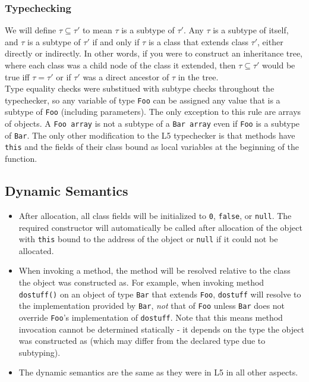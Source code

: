 \documentclass{article}
\begin{document}
\subsubsection{Typechecking}
We will define $\tau \subseteq \tau'$ to mean $\tau$ is a subtype of $\tau'$.
Any $\tau$ is a subtype of itself, and $\tau$ is a subtype of $\tau'$ if and only
if $\tau$ is a class that extends class $\tau'$, either directly or indirectly.
In other words, if you were to construct an inheritance tree, where each class
was a child node of the class it extended, then $\tau \subseteq \tau'$ would be
true iff $\tau = \tau'$ or if $\tau'$ was a direct ancestor of $\tau$ in the
tree. \\

Type equality checks were substitued with subtype checks throughout the
typechecker, so any variable of type \texttt{Foo} can be assigned any value that
is a subtype of \texttt{Foo} (including parameters). The only exception to this
rule are arrays of objects. A \texttt{Foo array} is not a subtype of a
\texttt{Bar array} even if \texttt{Foo} is a subtype of \texttt{Bar}. The only
other modification to the L5 typechecker is that methods have \texttt{this} and
the fields of their class bound as local variables at the beginning of the
function.

\subsection{Dynamic Semantics}
\begin{itemize}
\item After allocation, all class fields will be initialized to \texttt{0},
      \texttt{false}, or \texttt{null}. The required constructor will
      automatically be called after allocation of the object with \texttt{this}
      bound to the address of the object or \texttt{null} if it could not be
      allocated.
\item When invoking a method, the method will be resolved relative to the
      class the object was constructed as. For example, when invoking method
      \texttt{dostuff()} on an object of type \texttt{Bar} that extends
      \texttt{Foo}, \texttt{dostuff} will resolve to the implementation provided
      by \texttt{Bar}, \emph{not} that of \texttt{Foo} unless \texttt{Bar} does
      not override \texttt{Foo}'s implementation of \texttt{dostuff}. Note that
      this means method invocation cannot be determined statically - it depends
      on the type the object was constructed as (which may differ from the
      declared type due to subtyping).
\item The dynamic semantics are the same as they were in L5 in all other aspects.
\end{itemize}
\end{document}
